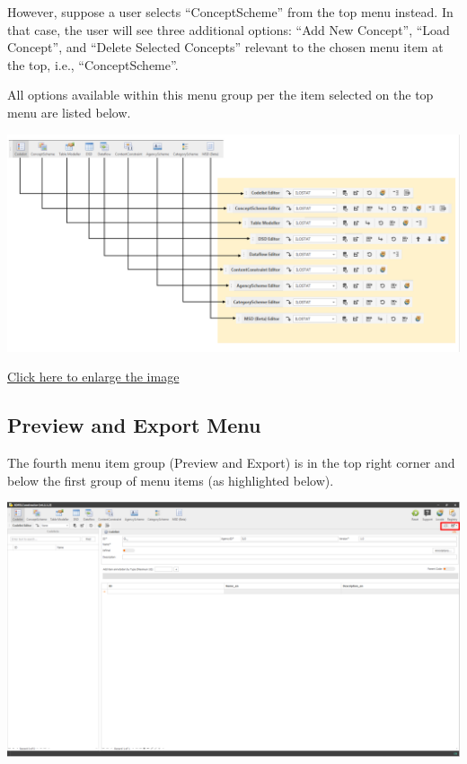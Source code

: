 \documentclass[
]{book}
\begin{document}
However, suppose a user selects ``ConceptScheme'' from the top menu instead. In that case, the user will see three additional options: ``Add New Concept'', ``Load Concept'', and ``Delete Selected Concepts'' relevant to the chosen menu item at the top, i.e., ``ConceptScheme''.

All options available within this menu group per the item selected on the top menu are listed below.

\begin{center}\includegraphics[width=1\linewidth]{./images/image032} \end{center}

\href{images/image032.png}{Click here to enlarge the image}

\hypertarget{preview-and-export-menu}{%
\subsection{Preview and Export Menu}\label{preview-and-export-menu}}

The fourth menu item group (Preview and Export) is in the top right corner and below the first group of menu items (as highlighted below).

\begin{center}\includegraphics[width=1\linewidth]{./images/image034} \end{center}
\end{document}
